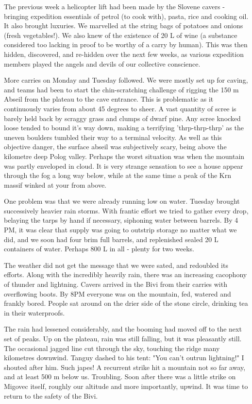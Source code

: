 The previous week a helicopter lift had been made by the Slovene cavers - bringing expedition essentials of petrol (to cook with), pasta, rice and cooking oil. It also brought luxuries. We marvelled at the string bags of potatoes and onions (fresh vegetables!). We also knew of the existence of 20 L of wine (a substance considered too lacking in proof to be worthy of a carry by human). This was then hidden, discovered, and re-hidden over the next few weeks, as various expedition members played the angels and devils of our collective conscience. 

More carries on Monday and Tuesday followed. We were mostly set up for caving, and teams had been to start the chin-scratching challenge of rigging the 150 m Abseil from the plateau to the cave entrance. This is problematic as it continuously varies from about 45 degrees to sheer. A vast quantity of scree is barely held back by scraggy grass and clumps of dwarf pine. Any scree knocked loose tended to bound it's way down, making a terrifying 'thrp-thrp-thrp' as the uneven boulders tumbled their way to a terminal velocity. As well as this objective danger, the surface abseil was subjectively scary, being above the kilometre deep Polog valley. Perhaps the worst situation was when the mountain was partly enveloped in cloud. It is very strange sensation to see a house appear through the fog a long way below, while at the same time a peak of the Krn massif winked at your from above. 

One problem was that we were already running low on water. Tuesday brought successively heavier rain storms. With frantic effort we tried to gather every drop, belaying the tarps by hand if necessary, siphoning water between barrels. By 4 PM, it was clear that supply was going to outstrip storage no matter what we did, and we soon had four brim full barrels, and replenished sealed 20 L containers of water. Perhaps 800 L in all - plenty for two weeks. 

The weather did not get the message that we were sated, and redoubled its efforts. Along with the incredibly heavily rain, there was an increasing cacophony of thunder and lightning. Cavers arrived in the Bivi from their carries with overflowing boots. By 8PM everyone was on the mountain, fed, watered and frankly bored. People sat around on the drier side of the stone circle, drinking tea in their waterproofs. 

The rain had lessened considerably, and the booming had moved off to the next set of peaks. Up on the plateau, rain was still falling, but it was pleasantly still. The occasional jagged line cut through the sky, touching the ridge many kilometres downwind. Tanguy dashed to his tent: "You can't outrun lightning!" I shouted after him. Such japes! A recurrent strike hit a mountain not so far away, and at least 500 m below us. Troubling. Soon after there was a little strike on Migovec itself, roughly our altitude and more importantly, upwind. It was time to return to the safety of the Bivi.


